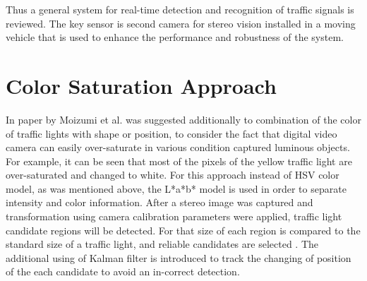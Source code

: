 \documentclass[letterpaper, 10 pt, conference]{ieeeconf} %
\begin{document}
Thus a general system for real-time detection and recognition of traffic signals is reviewed. The key sensor is second camera for stereo vision installed in a moving vehicle that is used to enhance the performance and robustness of the system. 


\section{Color Saturation Approach}
In paper by Moizumi et al. \cite{c3} was suggested additionally to combination of the color of traffic lights with shape or position, to consider the fact that digital video camera can easily over-saturate in various condition captured luminous objects. For example, it can be seen that most of the pixels of the yellow traffic light are over-saturated and changed to white. For this approach instead of HSV color model, as was mentioned above, the L*a*b* model is used in order to separate intensity and color information. After a stereo image was captured and transformation using camera calibration parameters were applied, traffic light candidate regions will be detected. For that size of each region is compared to the standard size of a traffic light, and reliable candidates are selected \cite{c3}. The additional using of Kalman filter is introduced to track the changing of position of the each candidate to avoid an in-correct detection. 
\end{document}
